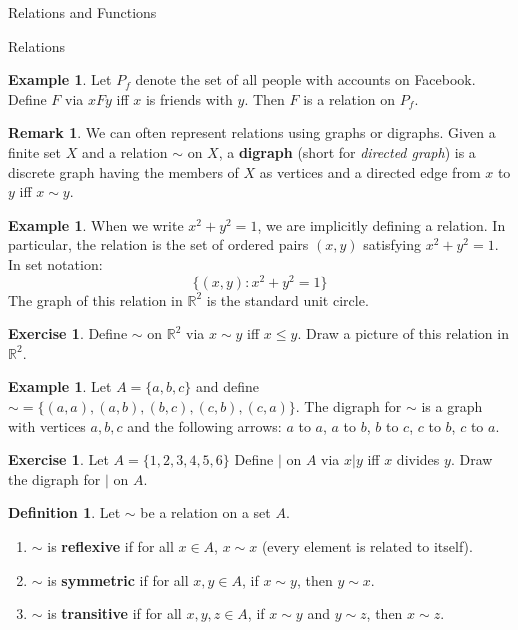 \documentclass[11pt]{article}
\theoremstyle{definition}
\newtheorem{definition}[theorem]{Definition}
\newtheorem{example}[theorem]{Example}
\newtheorem{exercise}[theorem]{Exercise}
\newtheorem{remark}[theorem]{Remark}
\begin{document}
\begin{section}{Relations and Functions}
\begin{subsection}{Relations}
\begin{example}
Let $P_f$ denote the set of all people with accounts on Facebook.  Define  $F$ via $xFy$ iff $x$ is friends with $y$.  Then $F$ is a relation on $P_f$.
\end{example}

\begin{remark}
We can often represent relations using graphs or digraphs.  Given a finite set $X$ and a relation $\sim$ on $X$, a \textbf{digraph} (short for \emph{directed graph}) is a discrete graph having the members of $X$ as vertices and a directed edge from $x$ to $y$ iff $x\sim y$.
\end{remark}

\begin{example}
When we write $x^2+y^2=1$, we are implicitly defining a relation.  In particular, the relation is the set of ordered pairs $(x,y)$ satisfying $x^2+y^2=1$.  In set notation:
\[
\{(x,y):x^2+y^2=1\}
\]
The graph of this relation in $\mathbb{R}^2$ is the standard unit circle.
\end{example}

\begin{exercise}
Define $\sim$ on $\mathbb{R}^2$ via $x\sim y$ iff $x\leq y$.  Draw a picture of this relation in $\mathbb{R}^2$.
\end{exercise}

\begin{example}
Let $A=\{a,b,c\}$ and define $\sim=\{(a,a),(a,b),(b,c),(c,b),(c,a)\}$.  The digraph for $\sim$ is a graph with vertices $a,b,c$ and the following arrows: $a$ to $a$, $a$ to $b$, $b$ to $c$, $c$ to $b$, $c$ to $a$.
\end{example}

\begin{exercise}
Let $A=\{1,2,3,4,5,6\}$  Define $|$ on $A$ via $x|y$ iff $x$ divides $y$.  Draw the digraph for $|$ on $A$.
\end{exercise}

\begin{definition}
Let $\sim$ be a relation on a set $A$.
\begin{enumerate}
\item $\sim$ is \textbf{reflexive} if for all $x\in A$, $x\sim x$ (every element is related to itself).
\item $\sim$ is \textbf{symmetric} if for all $x,y\in A$, if $x\sim y$, then $y\sim x$.
\item $\sim$ is \textbf{transitive} if for all $x,y,z\in A$, if $x\sim y$ and $y\sim z$, then $x\sim z$.
\end{enumerate}
\end{definition}


\end{subsection}
\end{section}
\end{document}
